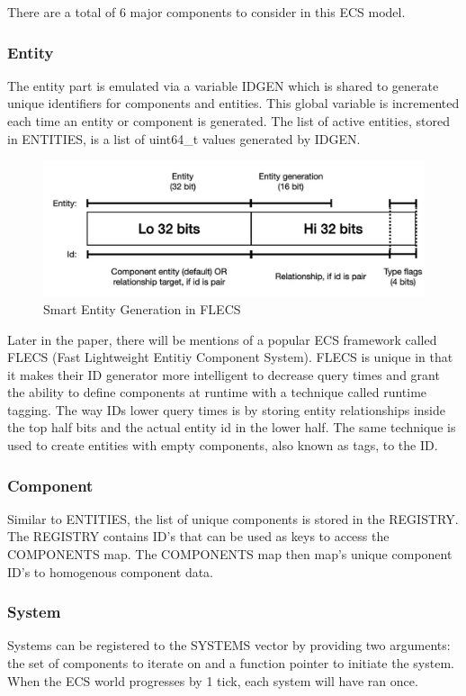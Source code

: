 There are a total of 6 major components to consider in this ECS model. 

\subsubsection{Entity}
The entity part is emulated via a variable IDGEN which is shared to generate unique identifiers for components and entities. This global variable is incremented each time an entity or component is generated. The list of active entities, stored in ENTITIES, is a list of uint64\_t values generated by IDGEN. 

\begin{figure}[H]
    \centering
    \includegraphics[width=0.5\linewidth]{resources/entity_generation.png}
    \caption{Smart Entity Generation in FLECS}
    \label{fig:entity_generation}
\end{figure}

Later in the paper, there will be mentions of a popular ECS framework called FLECS \textnormal{(Fast Lightweight Entitiy Component System)}. FLECS is unique in that it makes their ID generator more intelligent to decrease query times and grant the ability to define components at runtime with a technique called runtime tagging. The way IDs lower query times is by storing entity relationships inside the top half bits and the actual entity id in the lower half. The same technique is used to create entities with empty components, also known as tags, to the ID.  

\subsubsection{Component}
Similar to ENTITIES, the list of unique components is stored in the REGISTRY. The REGISTRY contains ID's that can be used as keys to access the COMPONENTS map. The COMPONENTS map then map's unique component ID's to homogenous component data. 

\subsubsection{System}
Systems can be registered to the SYSTEMS vector by providing two arguments: the set of components to iterate on and a function pointer to initiate the system. When the ECS world progresses by 1 tick, each system will have ran once.

